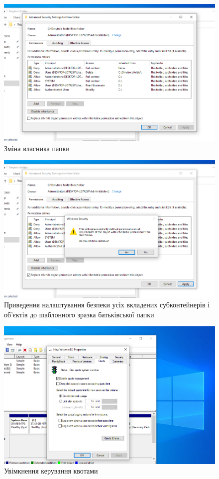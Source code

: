 \documentclass[oneside,14pt]{extarticle}
\begin{document}
\begin{normalsize}
	\begin{figure}[H]
		\centering
		\includegraphics[width=\columnwidth]{6}
		\caption{Зміна власника папки}
	\end{figure}
	
	\begin{figure}[H]
		\centering
		\includegraphics[width=\columnwidth]{7}
		\caption{Приведення налаштування безпеки усіх вкладених субконтейнерів і
			об’єктів до шаблонного зразка батьківської папки}
	\end{figure}
	
	\begin{figure}[H]
		\centering
		\includegraphics[width=\columnwidth]{8}
		\caption{Увімкнення керування квотами}
	\end{figure}
	

\end{normalsize}
\end{document}
